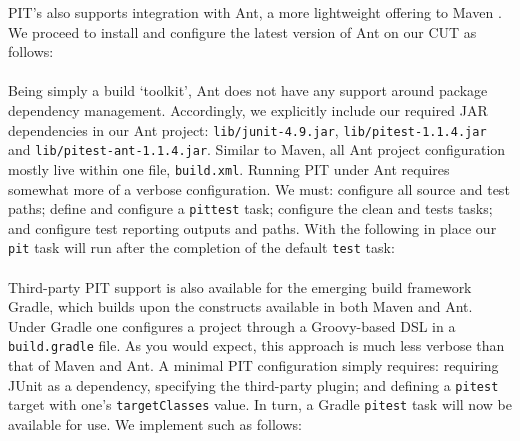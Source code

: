 \documentclass[a4paper]{article}
\begin{document}
\noindent PIT's also supports integration with Ant, a more lightweight offering to Maven \citep{Tahchiev}. We proceed to install and configure the latest version of Ant on our CUT as follows: 
\\

\\
Being simply a build `toolkit', Ant does not have any support around package dependency management. Accordingly, we explicitly include our required JAR dependencies in our Ant project:  \lstinline$lib/junit-4.9.jar$, \lstinline$lib/pitest-1.1.4.jar$ and \lstinline$lib/pitest-ant-1.1.4.jar$. Similar to Maven, all Ant project configuration mostly live within one file,  \lstinline$build.xml$. Running PIT under Ant requires somewhat more of a verbose configuration. We must: configure all source and test paths; define and configure a  \lstinline$pittest$ task; configure the clean and tests tasks; and configure test reporting outputs and paths. With the following in place our \lstinline$pit$ task will run after the completion of the default \lstinline$test$ task:
\\

\\

\noindent Third-party PIT support is also available for the emerging build framework Gradle, which builds upon the constructs available in both Maven and Ant. Under Gradle one configures a project through a Groovy-based DSL in a \lstinline$build.gradle$ file. As you would expect, this approach is much less verbose than that of Maven and Ant. A minimal PIT configuration simply requires: requiring JUnit as a dependency, specifying the third-party plugin; and defining a \lstinline$pitest$ target with one's \lstinline$targetClasses$ value. In turn, a Gradle \lstinline$pitest$ task will now be available for use. We implement such as follows:
\\

\end{document}
